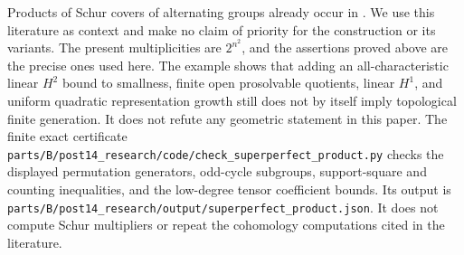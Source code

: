 \begin{remark}
Products of Schur covers of alternating groups already occur in
\cite[Section~1.6, Proposition~1.14, and Section~2, especially
Proposition~2.4 and Theorem~2.5]{CorobCookVannacci2021B}.
We use this literature as context and make no claim of priority
for the construction or its variants.  The present multiplicities
are \(2^{n^2}\), and the assertions proved above are the precise
ones used here.
The example shows that adding an all-characteristic linear
\(H^2\) bound to smallness, finite open prosolvable quotients,
linear \(H^1\), and uniform quadratic representation growth
still does not by itself imply topological finite generation.
It does not refute any geometric statement in this paper.
The finite exact certificate
\nolinkurl{parts/B/post14_research/code/check_superperfect_product.py}
checks the displayed permutation generators, odd-cycle subgroups,
support-square and counting inequalities, and the low-degree tensor
coefficient bounds.  Its output is
\nolinkurl{parts/B/post14_research/output/superperfect_product.json}.
It does not compute Schur multipliers or repeat the cohomology
computations cited in the literature.
\end{remark}
